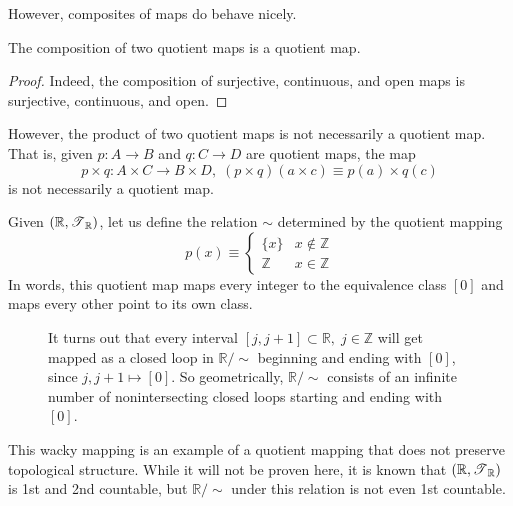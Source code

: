   However, composites of maps do behave nicely. 

  \begin{proposition}
    The composition of two quotient maps is a quotient map. 
  \end{proposition}
  \begin{proof}
    Indeed, the composition of surjective, continuous, and open maps is surjective, continuous, and open. 
  \end{proof}

  However, the product of two quotient maps is not necessarily a quotient map. That is, given $p: A \rightarrow B$ and $q: C \rightarrow D$ are quotient maps, the map 
  \begin{equation}
    p \times q: A \times C \rightarrow B \times D, \; (p \times q) (a \times c) \equiv p(a) \times q(c)
  \end{equation}
  is not necessarily a quotient map. 

  \begin{example}
    Given $(\mathbb{R}, \operatorname{\mathscr{T}}_{\mathbb{R}})$, let us define the relation $\sim$ determined by the quotient mapping 
    \begin{equation}
      p(x) \equiv \begin{cases} \{x\} & x \not\in \mathbb{Z} \\ \mathbb{Z} & x \in \mathbb{Z} \end{cases}
    \end{equation}
    In words, this quotient map maps every integer to the equivalence class $[0]$ and maps every other point to its own class. 

    \begin{figure}[H]
      \centering 
      \caption{It turns out that every interval $[j, j+1] \subset \mathbb{R}, \; j \in \mathbb{Z}$ will get mapped as a closed loop in $\mathbb{R} / \sim$ beginning and ending with $[0]$, since $j, j+1 \mapsto [0]$. So geometrically, $\mathbb{R} / \sim$ consists of an infinite number of nonintersecting closed loops starting and ending with $[0]$. }
      \label{fig:integer}
    \end{figure}

    This wacky mapping is an example of a quotient mapping that does not preserve topological structure. While it will not be proven here, it is known that $(\mathbb{R}, \operatorname{\mathscr{T}}_{\mathbb{R}})$ is 1st and 2nd countable, but $\mathbb{R} / \sim$ under this relation is not even 1st countable. 
  \end{example}

